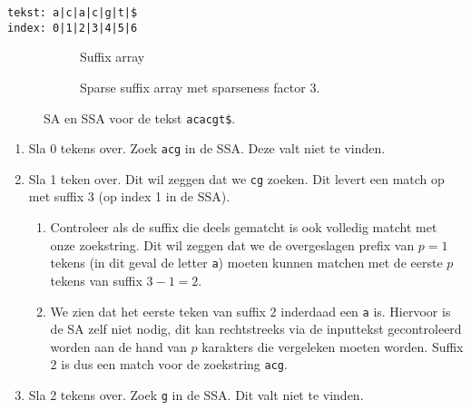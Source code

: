 \begin{center}
    \texttt{tekst: a|c|a|c|g|t|\$\\index: 0|1|2|3|4|5|6}
\end{center}
\begin{figure}[H]
    \hfill
    \begin{subfigure}[t]{0.45\linewidth}
        \centering
        \caption{Suffix array}
    \end{subfigure}
    \hfill
    \begin{subfigure}[t]{0.45\linewidth}
        \centering
        \caption{Sparse suffix array met sparseness factor 3.}
    \end{subfigure}
    \hfill
    \caption{SA en SSA voor de tekst \texttt{acacgt\$}.}
    \label{fig:sparse_sa}
\end{figure}

\begin{enumerate}
    \item Sla 0 tekens over.
    Zoek \texttt{acg} in de SSA. Deze valt niet te vinden.
    \item Sla 1 teken over.
    Dit wil zeggen dat we \texttt{cg} zoeken.
    Dit levert een match op met suffix 3 (op index 1 in de SSA).
    \begin{enumerate}
        \item Controleer als de suffix die deels gematcht is ook volledig matcht met onze zoekstring.
        Dit wil zeggen dat we de overgeslagen prefix van $p = 1$ tekens (in dit geval de letter \texttt{a}) moeten kunnen matchen met de eerste $p$ tekens van suffix $3 - 1 = 2$.
        \item We zien dat het eerste teken van suffix 2 inderdaad een \texttt{a} is.
        Hiervoor is de SA zelf niet nodig, dit kan rechtstreeks via de inputtekst gecontroleerd worden aan de hand van $p$ karakters die vergeleken moeten worden.
        Suffix 2 is dus een match voor de zoekstring \texttt{acg}.
    \end{enumerate}
    \item Sla 2 tekens over.
    Zoek \texttt{g} in de SSA. Dit valt niet te vinden.
\end{enumerate}

